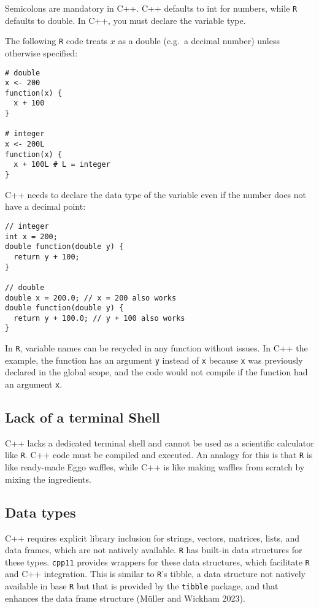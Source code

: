 Semicolons are mandatory in C++. C++ defaults to int for numbers, while \texttt{R}
defaults to double. In C++, you must declare the variable type.

The following \texttt{R} code treats \(x\) as a double (e.g.~a decimal number) unless
otherwise specified:

\begin{verbatim}
# double
x <- 200
function(x) {
  x + 100
}

# integer
x <- 200L
function(x) {
  x + 100L # L = integer
}
\end{verbatim}

C++ needs to declare the data type of the variable even if the number does not
have a decimal point:

\begin{verbatim}
// integer
int x = 200;
double function(double y) {
  return y + 100;
}

// double
double x = 200.0; // x = 200 also works
double function(double y) {
  return y + 100.0; // y + 100 also works
}
\end{verbatim}

In \texttt{R}, variable names can be recycled in any function without issues. In C++
the example, the function has an argument \texttt{y} instead of \texttt{x} because \texttt{x} was
previously declared in the global scope, and the code would not compile if the
function had an argument \texttt{x}.

\hypertarget{lack-of-a-terminal-shell}{%
\subsection{Lack of a terminal Shell}\label{lack-of-a-terminal-shell}}

C++ lacks a dedicated terminal shell and cannot be used as a scientific
calculator like \texttt{R}. C++ code must be compiled and executed. An analogy for
this is that \texttt{R} is like ready-made Eggo waffles, while C++ is like making
waffles from scratch by mixing the ingredients.

\hypertarget{data-types}{%
\subsection{Data types}\label{data-types}}

C++ requires explicit library inclusion for strings, vectors, matrices, lists,
and data frames, which are not natively available. \texttt{R} has built-in data
structures for these types. \texttt{cpp11} provides wrappers for these data structures,
which facilitate \texttt{R} and C++ integration. This is similar to \texttt{R}'s tibble, a
data structure not natively available in base \texttt{R} but that is provided by the
\texttt{tibble} package, and that enhances the data frame structure (Müller and Wickham 2023).


